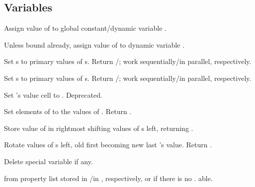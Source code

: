 \subsection{Variables}

\begin{LIST}{1cm}

  {
  Assign value of  to global constant/dynamic variable .
  }

  {
  Unless bound already, assign value of  to dynamic variable
  . 
  }

  {
  Set s to primary values of s. Return /\retval{\NIL}; work sequentially/in parallel, respectively. 
  }

  {
  Set s to primary values of s. Return /\retval{\NIL}; work sequentially/in parallel, respectively. 
  }

  {
  Set 's value cell to . Deprecated.
  }

  {
  Set elements of  to the values of
  . Return .
  }

  {
  Store value of  in rightmost  shifting values of
  s left, returning . 
  }

  {
  Rotate values of s left, old first becoming new last
  's value. Return \retval{\NIL}.
  }

  {
  Delete special variable  if any.
  }

  \label{:property_lists}
  {
   from property list stored in
  /in , respectively, or  if
  there is no . able.
  }


\end{LIST}

